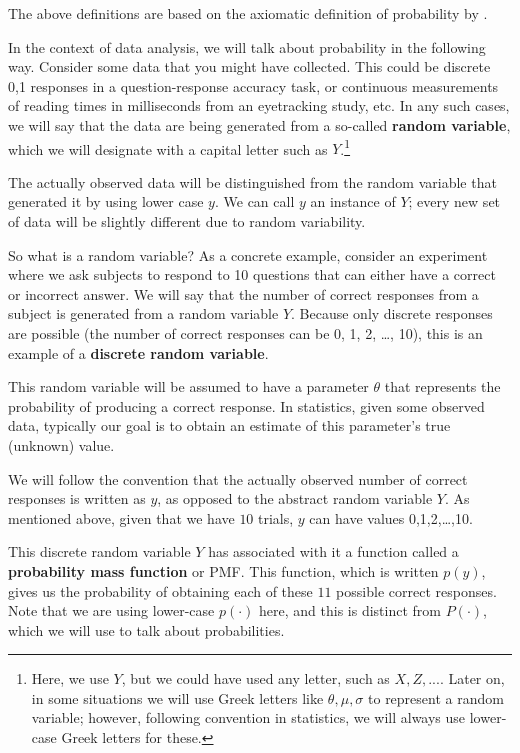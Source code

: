 \documentclass[12pt,]{krantz}
\theoremstyle{definition}
\theoremstyle{definition}
\theoremstyle{definition}
\theoremstyle{remark}
\begin{document}
The above definitions are based on the axiomatic definition of
probability by \citet{kolmogorov2018foundations}.

In the context of data analysis, we will talk about probability in the
following way. Consider some data that you might have collected. This
could be discrete 0,1 responses in a question-response accuracy task, or
continuous measurements of reading times in milliseconds from an
eyetracking study, etc. In any such cases, we will say that the data are
being generated from a so-called \textbf{random variable}, which we will
designate with a capital letter such as \(Y\).\footnote{Here, we use
  \(Y\), but we could have used any letter, such as \(X, Z,...\). Later
  on, in some situations we will use Greek letters like
  \(\theta, \mu, \sigma\) to represent a random variable; however,
  following convention in statistics, we will always use lower-case
  Greek letters for these.}

The actually observed data will be distinguished from the random
variable that generated it by using lower case \(y\). We can call \(y\)
an instance of \(Y\); every new set of data will be slightly different
due to random variability.

So what is a random variable? As a concrete example, consider an
experiment where we ask subjects to respond to 10 questions that can
either have a correct or incorrect answer. We will say that the number
of correct responses from a subject is generated from a random variable
\(Y\). Because only discrete responses are possible (the number of
correct responses can be 0, 1, 2, \ldots{}, 10), this is an example of a
\textbf{discrete random variable}.

This random variable will be assumed to have a parameter \(\theta\) that
represents the probability of producing a correct response. In
statistics, given some observed data, typically our goal is to obtain an
estimate of this parameter's true (unknown) value.

We will follow the convention that the actually observed number of
correct responses is written as \(y\), as opposed to the abstract random
variable \(Y\). As mentioned above, given that we have \(10\) trials,
\(y\) can have values 0,1,2,\ldots{},10.

This discrete random variable \(Y\) has associated with it a function
called a \textbf{probability mass function} or PMF. This function, which
is written \(p(y)\), gives us the probability of obtaining each of these
\(11\) possible correct responses. Note that we are using lower-case
\(p(\cdot)\) here, and this is distinct from \(P(\cdot)\), which we will
use to talk about probabilities.
\end{document}

